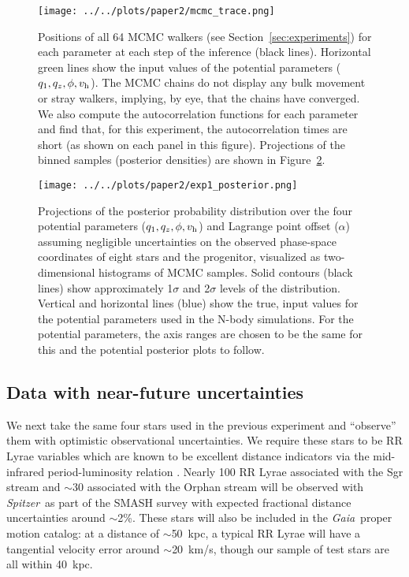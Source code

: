 \documentclass[letterpaper,12pt,preprint]{aastex}
\newcommand{\project}[1]{\textsl{#1}}
\newcommand{\gaia}{\project{Gaia}}
\newcommand{\spitzer}{\project{Spitzer}~}
\newcommand{\vhalo}{v_{\rm h}}
\newcommand{\potp}{$q_1,q_z,\phi,\vhalo$}
\begin{document}
\begin{figure}[!h]
\begin{center}
\texttt{[image: ../../plots/paper2/mcmc\_trace.png]}
\caption{ Positions of all 64 MCMC walkers (see Section~\ref{sec:experiments}) for each parameter at each step of the inference (black lines). Horizontal green lines show the input values of the potential parameters (\potp). The MCMC chains do not display any bulk movement or stray walkers, implying, by eye, that the chains have converged. We also compute the autocorrelation functions for each parameter and find that, for this experiment, the autocorrelation times are short (as shown on each panel in this figure). Projections of the binned samples (posterior densities) are shown in Figure~\ref{fig:exp1_posterior}. }\label{fig:trace}
\end{center}
\end{figure}

\begin{figure*}[!h]
\begin{center}
\texttt{[image: ../../plots/paper2/exp1\_posterior.png]}
\caption{ Projections of the posterior probability distribution over the four potential parameters (\potp) and Lagrange point offset ($\alpha$) assuming negligible uncertainties on the observed phase-space coordinates of eight stars and the progenitor, visualized as two-dimensional histograms of MCMC samples. Solid contours (black lines) show approximately 1$\sigma$ and 2$\sigma$ levels of the distribution. Vertical and horizontal lines (blue) show the true, input values for the potential parameters used in the N-body simulations. For the potential parameters, the axis ranges are chosen to be the same for this and the potential posterior plots to follow. }\label{fig:exp1_posterior}
\end{center}
\end{figure*}

\subsection{Data with near-future uncertainties}\label{sec:exp2}
We next take the same four stars used in the previous experiment and ``observe'' them with optimistic observational uncertainties. We require these stars to be RR Lyrae variables which are known to be excellent distance indicators via the mid-infrared period-luminosity relation \citep[as shown in, e.g.,][]{madore12}. Nearly 100 RR Lyrae associated with the Sgr stream and $\sim$30 associated with the Orphan stream will be observed with \spitzer as part of the SMASH survey \citep{smashprop} with expected fractional distance uncertainties around $\sim$2\%. These stars will also be included in the \gaia\, proper motion catalog: at a distance of $\sim$50~kpc, a typical RR Lyrae will have a tangential velocity error around $\sim$20~km/s, though our sample of test stars are all within 40~kpc.
\end{document}
